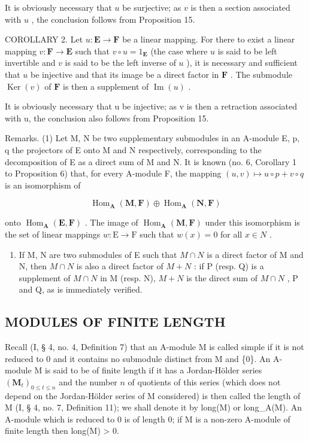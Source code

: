 It is obviously necessary that \(u\) be surjective; as \(v\) is then a section associated with \(u\) , the conclusion follows from Proposition 15.

COROLLARY 2. Let \(u: \mathbf{E} \to \mathbf{F}\) be a linear mapping. For there to exist a linear mapping \(v: \mathbf{F} \to \mathbf{E}\) such that \(v \circ u = 1_{\mathbf{E}}\) (the case where \(u\) is said to be left invertible and \(v\) is said to be the left inverse of \(u\) ), it is necessary and sufficient that \(u\) be injective and that its image be a direct factor in \(\mathbf{F}\) . The submodule \(\operatorname{Ker}(v)\) of \(\mathbf{F}\) is then a supplement of \(\operatorname{Im}(u)\) .

It is obviously necessary that u be injective; as v is then a retraction associated with u, the conclusion also follows from Proposition 15.

Remarks. (1) Let M, N be two supplementary submodules in an A-module E, p, q the projectors of E onto M and N respectively, corresponding to the decomposition of E as a direct sum of M and N. It is known (no. 6, Corollary 1 to Proposition 6) that, for every A-module F, the mapping \((u, v) \mapsto u \circ p + v \circ q\) is an isomorphism of

\[
\operatorname{Hom} _ {\mathbf {A}} (\mathbf {M}, \mathbf {F}) \oplus \operatorname{Hom} _ {\mathbf {A}} (\mathbf {N}, \mathbf {F})
\]

onto \(\operatorname{Hom}_{\mathbf{A}}(\mathbf{E},\mathbf{F})\) . The image of \(\operatorname{Hom}_{\mathbf{A}}(\mathbf{M},\mathbf{F})\) under this isomorphism is the set of linear mappings \(w:\mathrm{E}\to \mathrm{F}\) such that \(w(x) = 0\) for all \(x\in N\) .

\begin{enumerate}
\def\labelenumi{(\arabic{enumi})}
\setcounter{enumi}{1}
\tightlist
\item
  If M, N are two submodules of E such that \(M \cap N\) is a direct factor of M and N, then \(M \cap N\) is also a direct factor of \(M + N\) : if P (resp. Q) is a supplement of \(M \cap N\) in M (resp. N), \(M + N\) is the direct sum of \(M \cap N\) , P and Q, as is immediately verified.
\end{enumerate}

\subsection{MODULES OF FINITE LENGTH}

Recall (I, § 4, no. 4, Definition 7) that an A-module M is called simple if it is not reduced to 0 and it contains no submodule distinct from M and \{0\}. An A-module M is said to be of finite length if it has a Jordan-Hölder series \((\mathbf{M}_t)_{0 \leqslant t \leqslant n}\) and the number \(n\) of quotients of this series (which does not depend on the Jordan-Hölder series of M considered) is then called the length of M (I, § 4, no. 7, Definition 11); we shall denote it by long(M) or long\_A(M). An A-module which is reduced to 0 is of length 0; if M is a non-zero A-module of finite length then long(M) \textgreater{} 0.

